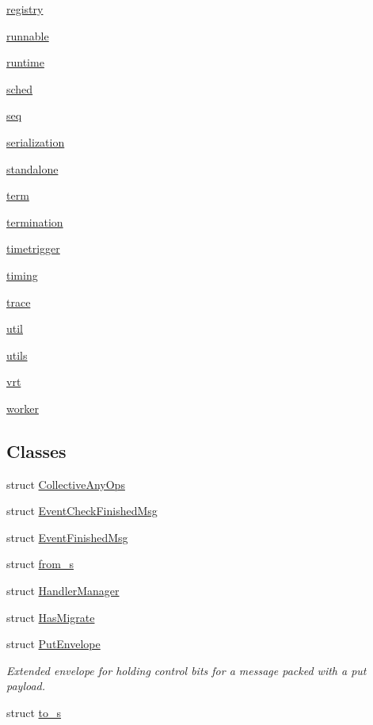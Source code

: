 \begin{DoxyCompactItemize}
 \hyperlink{namespacevt_1_1registry}{registry}
\item 
 \hyperlink{namespacevt_1_1runnable}{runnable}
\item 
 \hyperlink{namespacevt_1_1runtime}{runtime}
\item 
 \hyperlink{namespacevt_1_1sched}{sched}
\item 
 \hyperlink{namespacevt_1_1seq}{seq}
\item 
 \hyperlink{namespacevt_1_1serialization}{serialization}
\item 
 \hyperlink{namespacevt_1_1standalone}{standalone}
\item 
 \hyperlink{namespacevt_1_1term}{term}
\item 
 \hyperlink{namespacevt_1_1termination}{termination}
\item 
 \hyperlink{namespacevt_1_1timetrigger}{timetrigger}
\item 
 \hyperlink{namespacevt_1_1timing}{timing}
\item 
 \hyperlink{namespacevt_1_1trace}{trace}
\item 
 \hyperlink{namespacevt_1_1util}{util}
\item 
 \hyperlink{namespacevt_1_1utils}{utils}
\item 
 \hyperlink{namespacevt_1_1vrt}{vrt}
\item 
 \hyperlink{namespacevt_1_1worker}{worker}
\end{DoxyCompactItemize}
\subsection*{Classes}
\begin{DoxyCompactItemize}
\item 
struct \hyperlink{structvt_1_1_collective_any_ops}{Collective\+Any\+Ops}
\item 
struct \hyperlink{structvt_1_1_event_check_finished_msg}{Event\+Check\+Finished\+Msg}
\item 
struct \hyperlink{structvt_1_1_event_finished_msg}{Event\+Finished\+Msg}
\item 
struct \hyperlink{structvt_1_1from__s}{from\+\_\+s}
\item 
struct \hyperlink{structvt_1_1_handler_manager}{Handler\+Manager}
\item 
struct \hyperlink{structvt_1_1_has_migrate}{Has\+Migrate}
\item 
struct \hyperlink{structvt_1_1_put_envelope}{Put\+Envelope}
\begin{DoxyCompactList}\small\item\em Extended envelope for holding control bits for a message packed with a put payload. \end{DoxyCompactList}\item 
struct \hyperlink{structvt_1_1to__s}{to\+\_\+s}
\end{DoxyCompactItemize}
